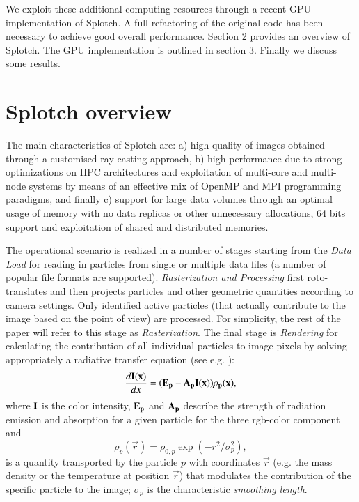 \documentclass[11pt,twoside]{article}
\begin{document}
We exploit these additional computing resources through a recent GPU implementation of Splotch. A full refactoring of the original code has been necessary to achieve good overall performance. Section 2 provides an overview of Splotch. The GPU implementation is outlined in section 3. Finally we discuss some results.

\section{Splotch overview}

The main characteristics of Splotch are: a) high quality of images obtained through a customised ray-casting
approach, b) high performance due to strong optimizations on HPC architectures and exploitation of multi-core and multi-node
systems by means of an effective mix of OpenMP and MPI programming paradigms, and finally c) support for large data volumes through an optimal usage of memory with
no data replicas or other unnecessary allocations, 64 bits support and exploitation
of shared and distributed memories.

The operational scenario is realized in a number of stages  starting from the
{\it Data Load} for reading in particles from single or multiple data files (a number of popular file
formats are supported). {\it Rasterization and Processing}  first roto-translates and then projects particles and other geometric quantities according to camera settings. Only identified active particles 
(that actually contribute to the image based on the point of view)
are processed. For simplicity, the rest
of the paper will refer to this stage as {\it Rasterization}. The final stage is {\it Rendering} for calculating the contribution of all individual particles to image pixels by
solving appropriately a radiative transfer equation (see e.g. \citet{1991par..book.....S}):
\begin{equation}\label{rad}
\frac{d\bf{I}(x)}{dx}=(\bf{E}_p-\bf{A}_p\bf{I}(x))\rho_p(x),
\end{equation}
where $\bf{I}$ is the color intensity, $\bf{E}_p$ and $\bf{A}_p$ 
describe the strength of radiation emission and absorption
for a given particle for the three rgb-color component and 
\begin{equation}\label{smooth}
\rho_p(\vec r)=\rho_{0,p}\exp(-r^2/\sigma_p^2),
\end{equation}
is a quantity transported by the particle $p$ with coordinates $\vec r$
(e.g. the mass density or the temperature at position $\vec r$)
that modulates the contribution of the specific particle to the image; $\sigma_p$
is the characteristic {\it smoothing length}.
\end{document}
